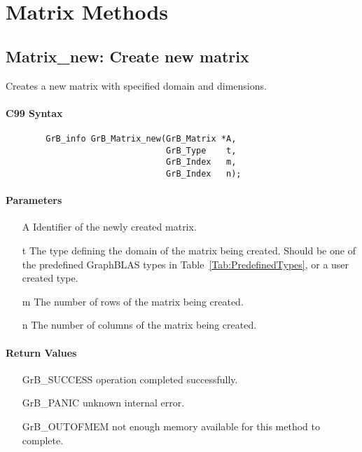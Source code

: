 \section{Matrix Methods}

\subsection{{\sf Matrix\_new}: Create new matrix}

Creates a new matrix with specified domain and dimensions.

\paragraph{C99 Syntax}

\begin{verbatim}
        GrB_info GrB_Matrix_new(GrB_Matrix *A,
                                GrB_Type    t,
                                GrB_Index   m,
                                GrB_Index   n);
\end{verbatim}

\paragraph{Parameters}

\begin{itemize}[leftmargin=1.1in]
    \item[{\sf A}] Identifier of the newly created matrix.
    \item[{\sf t}] The type defining the domain of the matrix being created. Should be one of the predefined
    GraphBLAS types in Table~\ref{Tab:PredefinedTypes}, or a user created type.
    \item[{\sf m}] The number of rows of the matrix being created.
    \item[{\sf n}] The number of columns of the matrix being created.
\end{itemize}


\paragraph{Return Values}

\begin{itemize}[leftmargin=2.1in]
\item[{\sf GrB\_SUCCESS}]   operation completed successfully.
\item[{\sf GrB\_PANIC}]     unknown internal error.
\item[{\sf GrB\_OUTOFMEM}]  not enough memory available for this method to complete.
\end{itemize}

